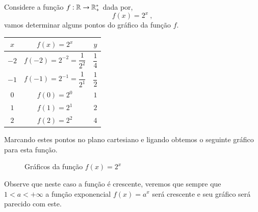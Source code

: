  \begin{exem}\label{ex:exp-2}
  Considere a função $f: \mathbb{R} \rightarrow \mathbb{R}_{+}^{*} $ dada por, 
  \[f(x) = 2^x \ , \]
  vamos determinar alguns pontos do gráfico da função $f$.
 
  \begin{table}[H]
  \centering
  \begin{tabular}{|c|c|c|} \hline
  \rowcolor{cinza}
  $x$ & $f(x) = 2^x$ & $y$ \\ \hline
  $-2$ & $f(-2)= 2^{-2}= \dfrac{1}{2^2}$ & $\dfrac{1}{4}$ \\ \hline
  $-1$ & $f(-1)= 2^{-1}= \dfrac{1}{2^1}$ & $\dfrac{1}{2}$ \\ \hline
  $0$ & $f(0)= 2^{0}$ & $1$ \\ \hline
  $1$ & $f(1)= 2^{1}$ & $2$ \\ \hline
  $2$ & $f(2)= 2^{2}$ & $4$ \\ \hline
  \end{tabular}
  \end{table}
  
  Marcando estes pontos no plano cartesiano e ligando obtemos o seguinte gráfico para esta função.
  
  \begin{figure}[H]
  \centering
    \caption{Gráficos da função $f(x)=2^x$}
  \end{figure}
  
  Observe que neste caso a função é crescente, veremos que sempre que $1< a < +\infty$ a função exponencial $f(x)=a^x$ será crescente e seu gráfico será parecido com este.
 
 \end{exem}

